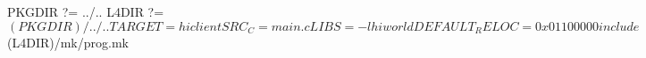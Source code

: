 PKGDIR          ?= ../..
L4DIR           ?= $(PKGDIR)/../..

TARGET          = hiclient
SRC_C           = main.c
LIBS            = -lhiworld
DEFAULT_RELOC   = 0x01100000

include $(L4DIR)/mk/prog.mk
